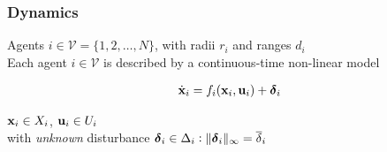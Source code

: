 \begin{frame} %
  \frametitle{Dynamics}

  Agents $i \in \mathcal{V} = \{1,2,\dots,N\}$, with radii $r_i$ and ranges $d_i$\\[4ex]

  Each agent $i\in\mathcal{V}$ is described by a continuous-time non-linear model

  \begin{align}
    \dot{\bm{\mathbf{x}}}_i = f_i(\bm{\mathbf{x}}_i, \bm{\mathbf{u}}_i) + \bm{\mathbf{\delta}}_i
  \end{align}

  $\bm{\mathbf{x}}_i \in X_i$, $\bm{\mathbf{u}}_i \in U_i$\\[4ex]

  with \textit{unknown} disturbance
  $\bm{\mathbf{\delta}}_i \in \Delta_i : \|\bm{\mathbf{\delta}}_i\|_{\infty} = \overline{\delta}_i$

\end{frame} %
